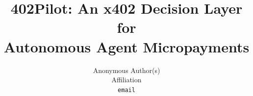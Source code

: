 \documentclass{article}
\title{402Pilot: An x402 Decision Layer for\\Autonomous Agent Micropayments}
\author{%
  Anonymous Author(s)\\
  Affiliation\\
  \texttt{email}
}
\begin{document}
\maketitle

\begin{abstract}

\end{abstract}










\begin{ack}
\end{ack}




\appendix


\newpage

\end{document}
